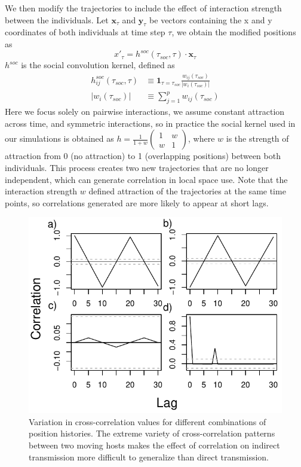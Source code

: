 \documentclass[11pt]{article}
\begin{document}
We then modify the trajectories to include the effect of interaction strength between the individuals. Let $\mathbf{x}_\tau$ and $\mathbf{y}_\tau$ be vectors containing the x and y coordinates of both individuals at time step $\tau$, we obtain the modified positions as
\begin{equation}
	x'_\tau=h^{soc}(\tau_{soc},\tau)\cdot\mathbf{x}_\tau
\end{equation}
$h^{soc}$ is the social convolution kernel, defined as \citep{Scharf2018}
\begin{equation}
\begin{aligned}
	h_{ij}^{soc}(\tau_{soc},\tau)&\equiv\mathbf{1}_{\tau=\tau_{soc}}\frac{w_{ij}(\tau_{soc})}{|w_i(\tau_{soc})|}\\
	|w_i(\tau_{soc})|&\equiv\sum_{j=1}^p w_{ij}(\tau_{soc})
\end{aligned}
\end{equation}
Here we focus solely on pairwise interactions, we assume constant attraction across time, and symmetric interactions, so in practice the social kernel used in our simulations is obtained as $h=\frac{1}{1+w}\left(\begin{smallmatrix}1&w\\w&1\end{smallmatrix}\right)$, where $w$ is the strength of attraction from 0 (no attraction) to 1 (overlapping positions) between both individuals. This process creates two new trajectories that are no longer independent, which can generate correlation in local space use. Note that the interaction strength $w$ defined attraction of the trajectories at the same time points, so correlations generated are more likely to appear at short lags. 



\clearpage

\begin{figure}
    \includegraphics[width=\textwidth]{figures/example_xcorrs.pdf}
    \caption{Variation in cross-correlation values for different combinations of position histories. The extreme variety of cross-correlation patterns between two moving hosts makes the effect of correlation on indirect transmission more difficult to generalize than direct transmission.}
    \label{fig:xcorrs}
\end{figure}
\end{document}
